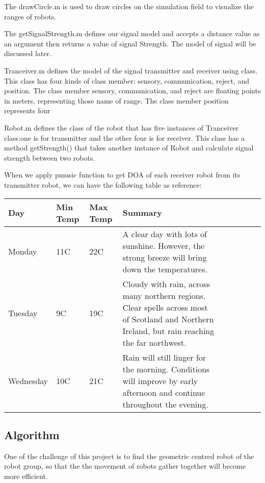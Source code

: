 The drawCircle.m is used to draw circles on the simulation field to visualize the ranges of robots.

The getSignalStrength.m defines our signal model and accepts a distance value as an argument then returns a value of signal Strength. The model of signal will be discussed later.

Tranceiver.m defines the model of the signal transmitter and receiver using class. This class has four kinds of class member: sensory, communication, reject, and position. The class member sensory, communication, and reject are floating points in meters, representing those name of range. The class member position represents four 

Robot.m defines the class of the robot that has five instances of Tranceiver class:one is for transmitter and the other four is for receiver. This class has a method getStrength() that takes another instance of Robot and calculate signal strength between two robots. 

When we apply pmusic function to get DOA of each receiver robot from its transmitter robot, we can have the following table as reference:
\begin{center}
    \begin{tabular}{ | l | l | l | l | l | l | l | l | l |}
    \hline
    Day & Min Temp & Max Temp & Summary \\ \hline
    Monday & 11C & 22C & A clear day with lots of sunshine.  
    However, the strong breeze will bring down the temperatures. \\ \hline
    Tuesday & 9C & 19C & Cloudy with rain, across many northern regions. Clear spells 
    across most of Scotland and Northern Ireland, 
    but rain reaching the far northwest. \\ \hline
    Wednesday & 10C & 21C & Rain will still linger for the morning. 
    Conditions will improve by early afternoon and continue 
    throughout the evening. \\
    \hline
    \end{tabular}
\end{center}

\subsection{Algorithm}
One of the challenge of this project is to find the geometric centred robot of the robot group, so that the the movement of robots gather together will become more efficient.  

